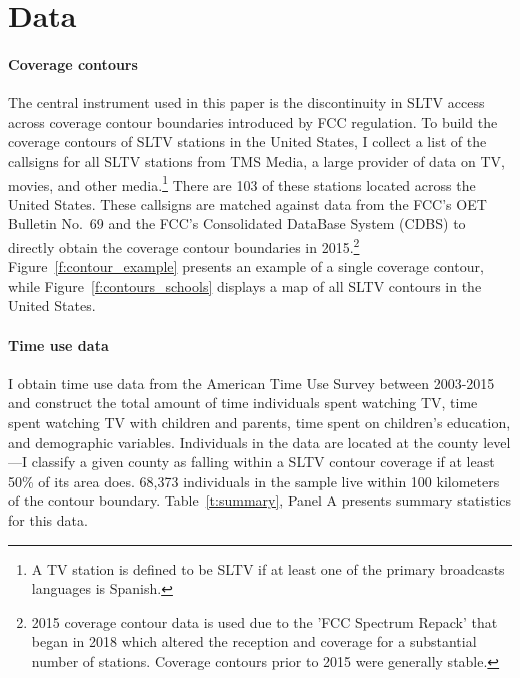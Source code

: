 \documentclass[11pt]{article}
\begin{document}
\section{Data}\label{s:data}



\paragraph{Coverage contours}  The central instrument used in this paper is the discontinuity in SLTV access across coverage contour boundaries introduced by FCC regulation. To build the coverage contours of SLTV stations in the United States, I collect a list of the callsigns for all SLTV stations from TMS Media, a large provider of data on TV, movies, and other media.\footnote{ A TV station is defined to be SLTV if at least one of the primary broadcasts languages is Spanish.} There are 103 of these stations located across the United States. These callsigns are matched against data from the FCC's OET Bulletin No.~69 and the FCC's Consolidated DataBase System (CDBS) to directly obtain the coverage contour boundaries in 2015.\footnote{ 2015 coverage contour data is used due to the 'FCC Spectrum Repack' that began in 2018 which altered the reception and coverage for a substantial number of stations. Coverage contours prior to 2015 were generally stable. }  %
Figure~\ref{f:contour_example} presents an example of a single coverage contour, while Figure~\ref{f:contours_schools} displays a map of all SLTV contours in the United States.

\paragraph{Time use data} I obtain time use data from the American Time Use Survey between 2003-2015 and construct the total amount of time individuals spent watching TV, time spent watching TV with children and parents, time spent on children's education, and demographic variables. Individuals in the data are located at the county level---I classify a given county as falling within a SLTV contour coverage if at least 50\% of its area does. 68,373 individuals in the sample live within 100 kilometers of the contour boundary. Table~\ref{t:summary}, Panel A presents summary statistics for this data.  
	
\end{document}
